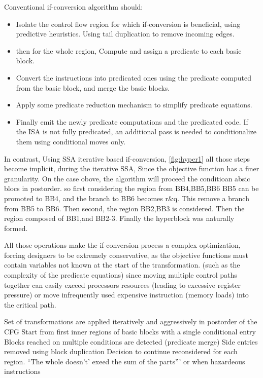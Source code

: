 Conventional if-conversion algorithm should:

\begin{itemize}
\item Isolate the control flow region for which if-conversion is beneficial, using predictive heuristics. Using tail duplication to remove incoming edges. 
\item then for the whole region, Compute and assign a predicate to each basic block.
\item Convert the instructions into predicated ones using the predicate computed from the basic block, and merge the basic blocks.
\item Apply some predicate reduction mechanism to simplify predicate equations.
\item Finally emit the newly predicate computations and the predicated code. If the ISA is not fully predicated, an additional pass is needed to conditionalize them using conditional moves only.
\end{itemize}

In contrast, Using SSA iterative based if-conversion, \ref{fig:hyper1} all those steps become implicit, during the iterative SSA, Since the objective function has a finer granularity. On the case obove, the algorithm will proceed the conditioan absic blocs in postorder.
so first considering the region from {BB4,BB5,BB6} BB5 can be promoted to BB4, and the branch to BB6 becomes r\&q. This remove a branch from BB5 to BB6.
Then second, the region {BB2,BB3 is considered}. Then the region composed of {BB1,and BB2-3}. Finally the hyperblock was naturally formed.

All those operations make the if-conversion process a complex optimization, forcing designers to be extremely conservative, as the objective functions must contain variables not known at the start of the transformation. (such as the complexity of the predicate equations) since moving multiple control paths together can easily exceed processors resources (leading to excessive register pressure) or move infrequently used expensive instruction (memory loads) into the critical path. 

Set of transformations are applied iteratively and aggressively in postorder of the CFG
Start from first inner regions of basic blocks with a single conditional entry
Blocks reached on multiple conditions are detected (predicate merge)
Side entries removed using block duplication 
Decision to continue reconsidered for each region. ``The whole doesn't' exeed the sum of the parts''' or when hazardeous instructions


